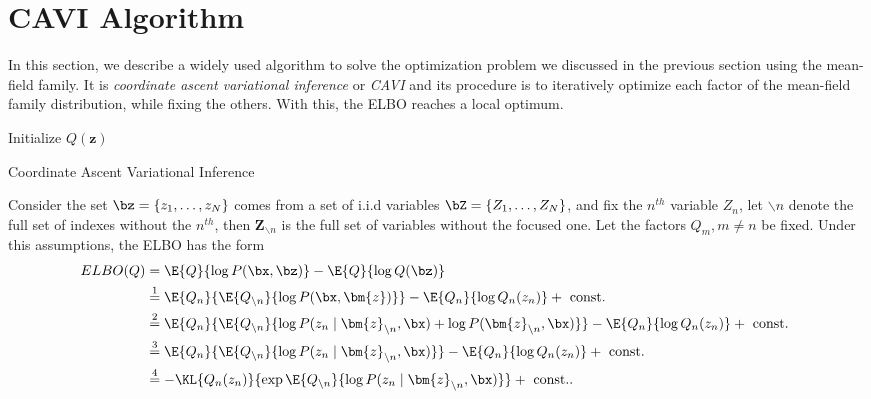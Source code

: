 \section{CAVI Algorithm }

In this section, we describe a widely used algorithm to solve the optimization problem we discussed in the previous section using the mean-field family. It is \emph{coordinate ascent variational inference} or \emph{CAVI} and its procedure is to iteratively optimize each factor of the mean-field family distribution, while fixing the others. With this, the ELBO reaches a local optimum.

 \begin{algorithm}[t]
  \SetAlgoLined
  Initialize \(Q(\bm{z})\)\;
  \;
  \caption{Coordinate Ascent Variational Inference}
  \label{alg:cavi}
\end{algorithm}

Consider the set \(\bz = \{z_1,\dots,z_N\}\) comes from a set of i.i.d variables \(\bZ = \{Z_1,\dots,Z_N\}\), and fix the \(n^{th}\) variable \(Z_{n}\), let \(\backslash n\) denote the full set of indexes without the \(n^{th}\), then \(\bm{Z}_{\backslash n}\) is the full set of variables without the focused one. Let the factors \(Q_{m}, m\neq n\) be fixed. Under this assumptions, the ELBO has the form
\[
  \begin{aligned}
    ELBO(Q) &= \E{Q}{\log{P(\bx, \bz)}} - \E{Q}{\log{Q(\bz)}}\\
    &\stackrel{1}{=} \E{Q_{n}}{\E{Q_{\backslash n}}{\log{P(\bx, \bm{z})}}} - \E{Q_{n}}{\log{Q_{n}(z_{n})}} + \text{ const. }\\
    &\stackrel{2}{=} \E{Q_{n}}{\E{Q_{\backslash n}}{\log{P(z_{n} \mid \bm{z}_{\backslash n}, \bx)} + \log{P(\bm{z}_{\backslash n}, \bx)}}} - \E{Q_{n}}{\log{Q_{n}(z_{n})}} + \text{ const. }\\
    &\stackrel{3}{=}  \E{Q_{n}}{\E{Q_{\backslash n}}{\log{P(z_{n} \mid \bm{z}_{\backslash n}, \bx)}}} - \E{Q_{n}}{\log{Q_{n}(z_{n})}} + \text{ const. }\\
    &\stackrel{4}{=} - \KL{Q_{n}(z_{n})}{  \exp{\E{Q_{\backslash n}}{\log{P(z_{n} \mid \bm{z}_{\backslash n}, \bx)}}} } + \text{ const.}.
  \end{aligned}
\]

